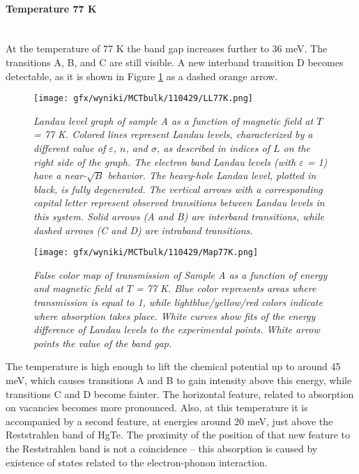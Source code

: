 \documentclass[titlepage,a4paper]{book}
\newcommand{\wciecie}{\quad\phantom{v}}
\newcommand{\myparagraph}[1]{\paragraph{#1}\mbox{}\\}
\begin{document}
\myparagraph{Temperature 77 K}
\wciecie
At the temperature of 77 K the band gap increases further to 36 meV. The transitions A, B, and C are still visible. A new interband transition D becomes detectable, as it is shown in Figure \ref{fig:LL_110429_77K} as a dashed orange arrow.
\begin{figure}[H]
	\centering
	\texttt{[image: gfx/wyniki/MCTbulk/110429/LL77K.png]}
	\vspace{-10pt}
	\caption{\textit{Landau level graph of sample A as a function of magnetic field at $T$ = 77 K. Colored lines represent Landau levels, characterized by a different value of $\varepsilon$, $n$, and $\sigma$, as described in indices of $L$ on the right side of the graph. The electron band Landau levels (with $\varepsilon$ = 1) have a near-$\sqrt{B}$ behavior. The heavy-hole Landau level, plotted in black, is fully degenerated. The vertical arrows with a corresponding capital letter represent observed transitions between Landau levels in this system. Solid arrows (A and B) are interband transitions, while dashed arrows (C and D) are intraband transitions.}}
	\label{fig:LL_110429_77K}
\end{figure}

\begin{figure}[ht]
	\centering
	\texttt{[image: gfx/wyniki/MCTbulk/110429/Map77K.png]}
	\vspace{-10pt}
	\caption{\textit{False color map of transmission of Sample A as a function of energy and magnetic field at $T$ = 77 K. Blue color represents areas where transmission is equal to 1, while lightblue/yellow/red colors indicate where absorption takes place. White curves show fits of the energy difference of Landau levels to the experimental points. White arrow points the value of the band gap.}}
	\label{fig:Map_110429_77K}
\end{figure} 

The temperature is high enough to lift the chemical potential up to around 45 meV, which causes transitions A and B to gain intensity above this energy, while transitions C and D become fainter. The horizontal feature, related to absorption on vacancies becomes more pronounced. Also, at this temperature it is accompanied by a second feature, at energies around 20 meV, just above the Reststrahlen band of HgTe. The proximity of the position of that new feature to the Reststrahlen band is not a coincidence -- this absorption is caused by existence of states related to the electron-phonon interaction.
\end{document}
